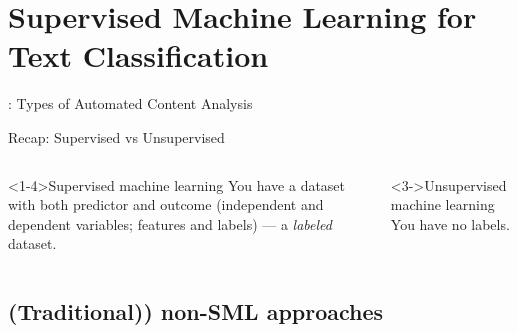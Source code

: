 \section{Supervised Machine Learning for Text Classification}

\begin{frame}{\cite{Boumans2016}: Types of Automated Content Analysis}
\end{frame}


\begin{frame}{Recap: Supervised vs Unsupervised}
\begin{columns}[t]

\begin{block}<1-4>{Supervised machine learning}
  You have a dataset with both predictor and outcome (independent and dependent variables; features and labels) --- a \emph{labeled} dataset.
\end{block}


\begin{block}<3->{Unsupervised machine learning}
  You have no labels. \\
\end{block}

\end{columns}

\end{frame}






\subsection{(Traditional)) non-SML approaches}

